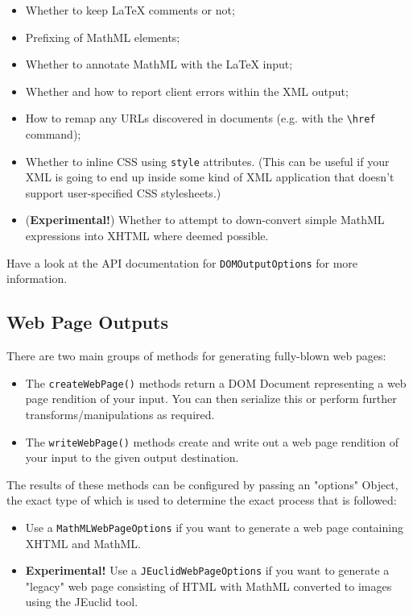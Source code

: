 \begin{itemize}
  \item Whether to keep LaTeX comments or not;
  \item Prefixing of MathML elements;
  \item Whether to annotate MathML with the LaTeX input;
  \item Whether and how to report client errors within the XML output;
  \item How to remap any URLs discovered in documents (e.g. with the \verb|\href| command);
  \item Whether to inline CSS using \verb|style| attributes. (This can be useful if your XML
    is going to end up inside some kind of XML application that doesn't support user-specified
    CSS stylesheets.)
  \item (\textbf{Experimental!}) Whether to attempt to down-convert simple MathML expressions
    into XHTML where deemed possible.
\end{itemize}

Have a look at the API documentation for \verb|DOMOutputOptions| for more information.

\subsection*{Web Page Outputs}

There are two main groups of methods for generating fully-blown web pages:

\begin{itemize}

  \item The \verb|createWebPage()| methods return a DOM Document representing a
    web page rendition of your input. You can then serialize this or perform
    further transforms/manipulations as required.

  \item The \verb|writeWebPage()| methods create and write out a web page
    rendition of your input to the given output destination.

\end{itemize}

The results of these methods can be configured by passing an "options" Object, the
exact type of which is used to determine the exact process that is followed:

\begin{itemize}
  \item Use a \verb|MathMLWebPageOptions| if you want to generate a web
    page containing XHTML and MathML.

  \item \textbf{Experimental!} Use a \verb|JEuclidWebPageOptions| if you
    want to generate a "legacy" web page consisting of HTML with MathML converted
    to images using the JEuclid tool.
\end{itemize}

